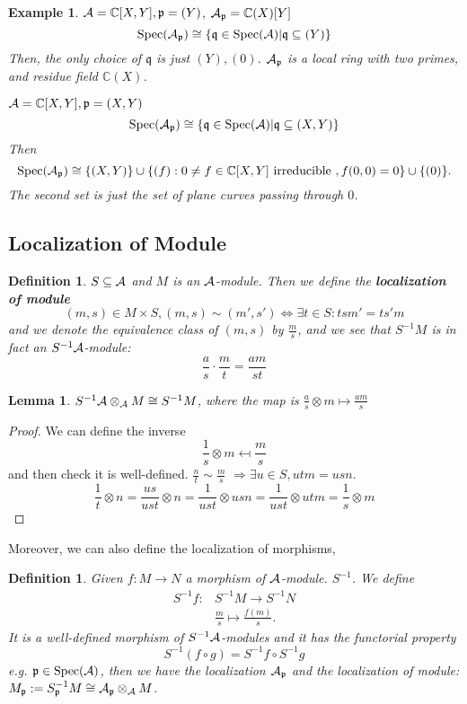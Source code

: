 \documentclass[11pt]{article}
\newtheorem{lemma}[thm]{Lemma}
\newtheorem{dfn}[thm]{Definition}
\newtheorem{ex}[thm]{Example}
\newcommand{\cplx}{\mathbb C}
\newcommand{\scp}{{\mathfrak p}}
\newcommand{\scq}{\mathfrak q}
\newcommand{\cala}{{\cal A}}
\newcommand{\Lrta}{\Longrightarrow}
\newcommand{\lrta}{\longrightarrow}
\newcommand{\Llrta}{\Longleftrightarrow}
\begin{document}
\begin{ex}
$\cala=\cplx[X,Y],\scp=(Y)$, $\cala_\scp=\cplx(X)[Y]$\\
$$
\text{Spec}(\cala_\scp)\cong \left\{\scq\in \text{Spec}(\cala)|\scq\subseteq (Y)\right\}
$$
Then, the only choice of $\scq$ is just $(Y),(0)$. 
$\cala_\scp$ is a local ring with two primes, and residue field $\cplx(X)$.

$\cala=\cplx[X,Y],\scp=(X,Y)$\\
$$
\text{Spec}(\cala_\scp)\cong \left\{\scq\in \text{Spec}(\cala)|\scq\subseteq (X,Y)\right\}
$$
Then
$$
\text{Spec}(\cala_\scp)\cong \{(X,Y)\}\cup\{(f):0\neq f\in \cplx[X,Y] \text{ irreducible }, f(0,0)=0\}\cup\{(0)\}.
$$
The second set is just the set of plane curves passing through $0$.
\end{ex}

\subsection*{Localization of Module}
\begin{dfn}
$S\subseteq \cala$ and $M$ is an $\cala$-module. Then we define the \textbf{localization of module}
$$
(m,s)\in M\times S, (m,s)\sim (m',s')\Llrta \exists t\in S: tsm'=ts'm
$$
and we denote the equivalence class of $(m,s)$ by $\frac{m}{s}$, and we see that $S^{-1}M$ is in fact an $S^{-1}\cala$-module:
$$
\frac{a}{s}\cdot \frac{m}{t}=\frac{am}{st}
$$
\end{dfn}

\begin{lemma}
$S^{-1}\cala\otimes_{\cala}M\cong S^{-1}M$, where the map is $\frac{a}{s}\otimes m\mapsto \frac{am}{s}$
\end{lemma}
\begin{proof}
We can define the inverse
$$
\frac{1}{s}\otimes m \mapsfrom\frac{m}{s}
$$
and then check it is well-defined.
$\frac{n}{t}\sim\frac{m}{s}$ $\Lrta \exists u\in S , ut m=us n$. 
$$
\frac{1}{t}\otimes n=\frac{us}{ust}\otimes n=\frac{1}{ust}\otimes usn=\frac{1}{ust}\otimes utm=\frac{1}{s}\otimes m
$$
\end{proof}

Moreover, we can also define the localization of morphisms,
\begin{dfn}
Given $f:M\lrta N$ a morphism of $\cala$-module. $S^{-1}$. We define 
$$
\begin{aligned}
S^{-1}f:&S^{-1}M\lrta S^{-1}N\\
& \frac{m}{s}\longmapsto\frac{f(m)}{s}.
\end{aligned}
$$
It is a well-defined morphism of $S^{-1}\cala$-modules and it has the functorial property
$$
S^{-1}(f\circ g)=S^{-1}f\circ S^{-1}g
$$
e.g. 
$\scp\in \text{Spec}(\cala)$, then we have the localization $\cala_\scp$ and the localization of module: $M_\scp:=S^{-1}_\scp M\cong \cala_{\scp}\otimes_\cala M$.
\end{dfn}
\end{document}
